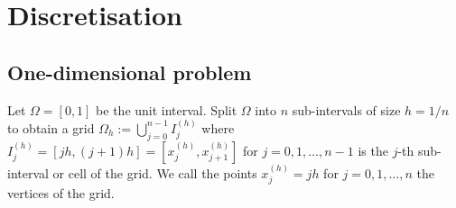 \documentclass[11pt]{article}
\begin{document}
\section{Discretisation}
\subsection{One-dimensional problem}
Let $\Omega = [0,1]$ be the unit interval. Split $\Omega$ into $n$ sub-intervals of size $h=1/n$ to obtain a grid \mbox{$\Omega_h := \bigcup_{j=0}^{n-1} I_j^{(h)}$} where $I_j^{(h)}=[jh,(j+1)h]=[x^{(h)}_j,x^{(h)}_{j+1}]$ for $j=0,1,\dots,n-1$ is the $j$-th sub-interval or cell of the grid. We call the points $x^{(h)}_j=jh$ for $j=0,1,\dots,n$ the vertices of the grid.
\end{document}
